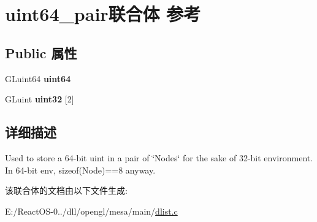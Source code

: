 \hypertarget{unionuint64__pair}{}\section{uint64\+\_\+pair联合体 参考}
\label{unionuint64__pair}
\subsection*{Public 属性}
\begin{DoxyCompactItemize}
\item 
\mbox{\label{unionuint64__pair_a09ab1fa6ca796f5a685e9acb8e87d880}} 
G\+Luint64 {\bfseries uint64}
\item 
\mbox{\label{unionuint64__pair_a5f97e064283fa55a7dfa053e8766af55}} 
G\+Luint {\bfseries uint32} \mbox{[}2\mbox{]}
\end{DoxyCompactItemize}


\subsection{详细描述}
Used to store a 64-\/bit uint in a pair of \char`\"{}\+Nodes\char`\"{} for the sake of 32-\/bit environment. In 64-\/bit env, sizeof(\+Node)==8 anyway. 

该联合体的文档由以下文件生成\+:\begin{DoxyCompactItemize}
\item 
E\+:/\+React\+O\+S-\/0../dll/opengl/mesa/main/\hyperlink{dlist_8c}{dlist.\+c}\end{DoxyCompactItemize}
